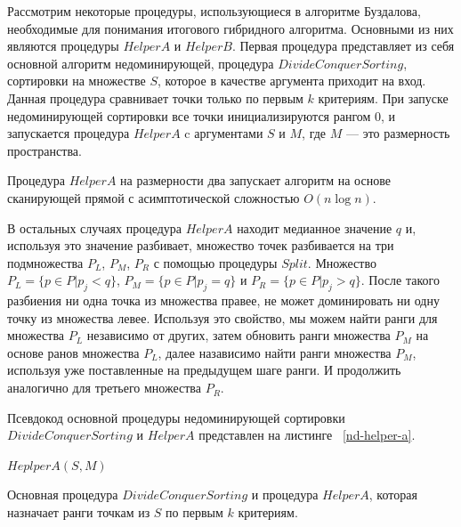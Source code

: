 Рассмотрим некоторые процедуры, использующиеся в алгоритме Буздалова, необходимые для понимания итогового гибридного алгоритма. Основными из них являются процедуры $HelperA$ и $HelperB$. Первая процедура представляет из себя основной алгоритм недоминирующей, процедура $DivideConquerSorting$, сортировки на множестве $S$, которое в качестве аргумента приходит на вход. Данная процедура сравнивает точки только по первым $k$ критериям. При запуске недоминирующей сортировки все точки инициализируются рангом $0$, и запускается процедура $HelperA$ c аргументами $S$ и $M$, где $M$ {---} это размерность пространства.


Процедура $HelperA$ на размерности два запускает алгоритм на основе сканирующей прямой с асимптотической сложностью $O(n \log n)$.

В остальных случаях процедура $HelperA$ находит медианное значение $q$ и, используя это значение разбивает, множество точек разбивается на три подмножества $P_L$, $P_M$, $P_R$ с помощью процедуры $Split$. Множество $P_L = \{p \in P | p_j < q\}$, $P_M = \{p \in P | p_j = q\}$ и $P_R = \{p \in P | p_j > q\}$. После такого разбиения ни одна точка из множества правее, не может доминировать ни одну точку из множества левее. Используя это свойство, мы можем найти ранги для множества $P_L$ независимо от других, затем обновить ранги множества $P_M$ на основе ранов множества $P_L$, далее назависимо найти ранги множества $P_M$, используя уже поставленные на предыдущем шаге ранги. И продолжить аналогично для третьего множества $P_R$.

Псевдокод основной процедуры недоминирующей сортировки $DivideConquerSorting$ и $HelperA$ представлен на листинге ~\ref{nd-helper-a}.

\begin{algorithm}
\begin{algorithmic}[1]
    \State $HeplperA(S, M)$
\EndProcedure
{}
     \Return
    \Else
    \EndIf
\EndProcedure
\end{algorithmic}
\caption{Основная процедура \textsc{$DivideConquerSorting$} и процедура \textsc{$HelperA$}, которая назначает ранги точкам из $S$ по первым $k$ критериям.}
\label{nd-helper-a}
\end{algorithm}

